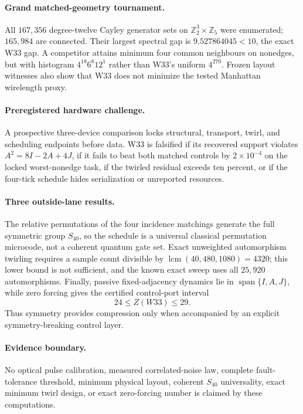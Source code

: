 \paragraph{Grand matched-geometry tournament.}
All $167{,}356$ degree-twelve Cayley generator sets on $\mathbb Z_2^3\times\mathbb Z_5$ were enumerated; $165{,}984$ are connected.  Their largest spectral gap is $9.527864045<10$, the exact W33 gap.  A competitor attains minimum four common neighbours on nonedges, but with histogram $4^{18}6^8 12^1$ rather than W33's uniform $4^{270}$.  Frozen layout witnesses also show that W33 does not minimize the tested Manhattan wirelength proxy.

\paragraph{Preregistered hardware challenge.}
A prospective three-device comparison locks structural, transport, twirl, and scheduling endpoints before data.  W33 is falsified if its recovered support violates $A^2=8I-2A+4J$, if it fails to beat both matched controls by $2\times10^{-4}$ on the locked worst-nonedge task, if the twirled residual exceeds ten percent, or if the four-tick schedule hides serialization or unreported resources.

\paragraph{Three outside-lane results.}
The relative permutations of the four incidence matchings generate the full symmetric group $S_{40}$, so the schedule is a universal classical permutation microcode, not a coherent quantum gate set.  Exact unweighted automorphism twirling requires a sample count divisible by $\operatorname{lcm}(40,480,1080)=4320$; this lower bound is not sufficient, and the known exact sweep uses all $25{,}920$ automorphisms.  Finally, passive fixed-adjacency dynamics lie in $\operatorname{span}\{I,A,J\}$, while zero forcing gives the certified control-port interval
\[
24\le Z(W33)\le29.
\]
Thus symmetry provides compression only when accompanied by an explicit symmetry-breaking control layer.

\paragraph{Evidence boundary.}
No optical pulse calibration, measured correlated-noise law, complete fault-tolerance threshold, minimum physical layout, coherent $S_{40}$ universality, exact minimum twirl design, or exact zero-forcing number is claimed by these computations.
